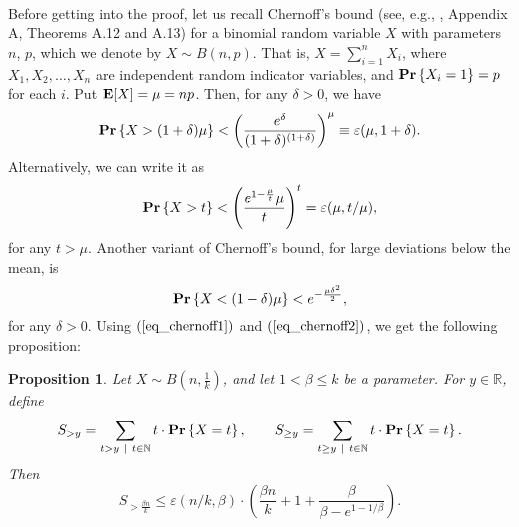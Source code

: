 \documentclass[11pt]{article}
\newtheorem{proposition}[theorem]{Proposition}
{\theorembodyfont{\rm} \newtheorem{defn}[theorem]{Definition}}
\def\reals{\mathbb R}
\def\eps{\varepsilon}
\begin{document}
\paragraph{}
Before getting into the proof, let us recall Chernoff's bound (see, e.g., \cite{as92}, Appendix A, Theorems A.12 and A.13) for a binomial random variable $X$ with parameters $n$, $p$, which we denote by $X \sim B(n,p)$. That is, $X = \sum_{i=1}^{n} X_{i}$, where $X_{1}, X_{2}, \ldots, X_{n}$ are independent random indicator variables, and ${\bf Pr}\left\{ X_{i} = 1 \right\} = p$ for each $i$. Put ${\bf E}[X] = \mu = np$. Then, for any $\delta > 0$, we have
\begin{equation} \label{eq_chernoff1}
{\bf Pr}\left\{X > (1+\delta)\mu \right\} < \left(\frac{e^{\delta}}{(1+\delta)^{(1+\delta)}}\right)^{\mu} \equiv \eps(\mu,1+\delta).
\end{equation}
Alternatively, we can write it as
\begin{equation} \label{eq_chernoff2}
{\bf Pr}\left\{X > t \right\} < \left(\frac{e^{1-\frac{\mu}{t}}\mu}{t} \right)^{t} = \eps(\mu, t/\mu),
\end{equation}
for any $t > \mu$. Another variant of Chernoff's bound, for large deviations below the mean, is
\begin{equation} \label{eq_chernoff3}
{\bf Pr}\left\{X < (1 - \delta)\mu \right\} < e^{-\frac{\mu\delta^{2}}{2}},
\end{equation}
for any $\delta > 0$. Using $(\ref{eq_chernoff1})$ and $(\ref{eq_chernoff2})$, we get the following proposition:
\begin{proposition} \label{prop_sum}
Let $X \sim B(n,\frac{1}{k})$, and let $1 < \beta \leq k$ be a parameter. For $y \in \reals$, define
$$
S_{> y} = \sum_{t > y \ \mid \ t \in \mathbb N} t \cdot {\bf Pr}\left\{X = t\right\}, \quad\quad
S_{\geq y} = \sum_{t \geq y \ \mid \ t \in \mathbb N} t \cdot {\bf Pr}\left\{X = t\right\}.
$$
Then
$$
S_{> \frac{\beta n}{k}} \leq \eps(n/k, \beta) \cdot \left(\frac{\beta n}{k} + 1 + \frac{\beta}{\beta - e^{1-1/\beta}} \right).
$$
\end{proposition}
\end{document}
